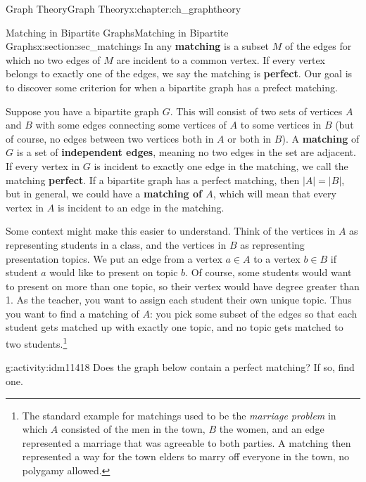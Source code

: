 \documentclass[oneside,10pt,]{book}
\newcommand{\terminology}[1]{\textbf{#1}}
\numberwithin{equation}{chapter}
\newcommand{\card}[1]{\left| #1 \right|}
\begin{document}
\begin{chapterptx}{Graph Theory}{}{Graph Theory}{}{}{x:chapter:ch_graphtheory}
%
\begin{sectionptx}{Matching in Bipartite Graphs}{}{Matching in Bipartite Graphs}{}{}{x:section:sec_matchings}
In any \terminology{matching} is a subset \(M\) of the edges for which no two edges of \(M\) are incident to a common vertex.  If every vertex belongs to exactly one of the edges, we say the matching is \terminology{perfect}. Our goal is to discover some criterion for when a bipartite graph has a prefect matching.%
\par
{} Suppose you have a bipartite graph \(G\). This will consist of two sets of vertices \(A\) and \(B\) with some edges connecting some vertices of \(A\) to some vertices in \(B\) (but of course, no edges between two vertices both in \(A\) or both in \(B\)). A \terminology{matching} of \(G\) is a set of \terminology{independent edges}, meaning no two edges in the set are adjacent.  If every vertex in \(G\) is incident to exactly one edge in the matching, we call the matching \terminology{perfect}. If a bipartite graph has a perfect matching, then \(\card{A} = \card{B}\), but in general, we could have a \terminology{matching of \(A\)}, which will mean that every vertex in \(A\) is incident to an edge in the matching.%
\par
Some context might make this easier to understand. Think of the vertices in \(A\) as representing students in a class, and the vertices in \(B\) as representing presentation topics. We put an edge from a vertex \(a \in A\) to a vertex \(b \in B\) if student \(a\) would like to present on topic \(b\). Of course, some students would want to present on more than one topic, so their vertex would have degree greater than 1. As the teacher, you want to assign each student their own unique topic. Thus you want to find a matching of \(A\): you pick some subset of the edges so that each student gets matched up with exactly one topic, and no topic gets matched to two students.\footnote{The standard example for matchings used to be the \emph{marriage problem} in which \(A\) consisted of the men in the town, \(B\) the women, and an edge represented a marriage that was agreeable to both parties.  A matching then represented a way for the town elders to marry off everyone in the town, no polygamy allowed.\label{g:fn:idm11414}}%
\begin{activity}{}{g:activity:idm11418}%
Does the graph below contain a perfect matching? If so, find one.%
\begin{sidebyside}{1}{0.25}{0.25}{0}%
\begin{sbspanel}{0.5}%

\end{sbspanel}
\end{sidebyside}
\end{activity}
\end{sectionptx}
\end{chapterptx}
\end{document}
